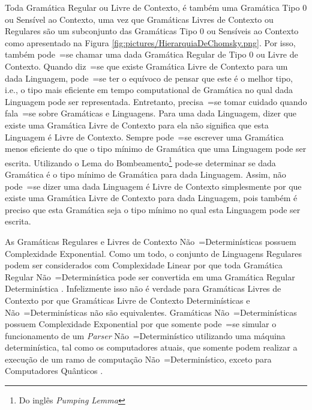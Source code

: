 {    Toda Gramática Regular ou Livre de Contexto,
    é também uma Gramática Tipo 0 ou Sensível ao Contexto,
    uma vez que Gramáticas Livres de Contexto ou Regulares são um
    subconjunto das Gramáticas Tipo 0 ou Sensíveis ao Contexto como
    apresentado na Figura \ref{fig:pictures/HierarquiaDeChomsky.png}.
    Por isso,
    também pode~=se chamar uma dada Gramática Regular de Tipo 0 ou Livre de Contexto.
    Quando diz~=se que existe Gramática Livre de Contexto para um dada Linguagem,
    pode~=se ter o equívoco de pensar que este é o melhor tipo,
    i.e.,
    o tipo mais eficiente em tempo computational de Gramática
    no qual dada Linguagem pode ser representada.
    Entretanto,
    precisa~=se tomar cuidado quando fala~=se sobre Gramáticas e
    Linguagens.
    Para uma dada Linguagem,
    dizer que existe uma Gramática Livre de Contexto para ela
    não significa que esta Linguagem é Livre de Contexto.
    Sempre pode~=se escrever uma Gramática menos eficiente do que o
    tipo mínimo de Gramática que uma Linguagem pode ser escrita.
    Utilizando o Lema do Bombeamento\footnote{Do inglês \textit{Pumping Lemma}} \cite{hopcroftBook}
    pode-se determinar se dada Gramática é o tipo mínimo de Gramática para dada Linguagem.
    Assim,
    não pode~=se dizer uma dada Linguagem é Livre de Contexto simplesmente
    por que existe uma Gramática Livre de Contexto para dada Linguagem,
    pois também é preciso que esta Gramática seja o tipo
    mínimo no qual esta Linguagem pode ser escrita.

    As Gramáticas Regulares e
    Livres de Contexto Não~=Determinísticas possuem Complexidade Exponential.
    Como um todo,
    o conjunto de Linguagens Regulares podem ser considerados com Complexidade
    Linear por que toda Gramática Regular Não~=Determinística pode ser
    convertida em uma Gramática Regular Determinística \cite{sipserBook}.
    Infelizmente isso não é verdade para Gramáticas Livres de Contexto
    por que Gramáticas Livre de Contexto Determinísticas e
    Não~=Determinísticas não são equivalentes.
    Gramáticas Não~=Determinísticas possuem Complexidade Exponential por que
    somente pode~=se simular o funcionamento de um \textit{Parser}
    Não~=Determinístico utilizando uma máquina determinística,
    tal como os computadores atuais,
    que somente podem realizar a execução de um ramo de computação Não~=Determinístico,
    exceto para Computadores Quânticos \cite{nonlinearQuantumComputers}.

}
